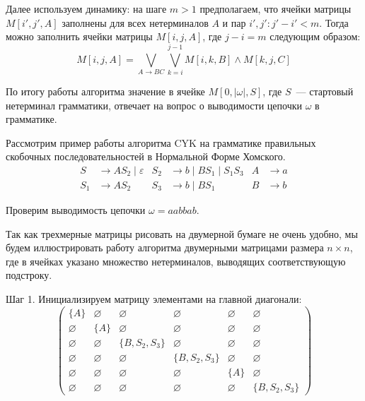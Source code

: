 Далее используем динамику: на шаге $m > 1$ предполагаем, что ячейки матрицы $M[i', j', A]$ заполнены для всех нетерминалов $A$ и пар $i', j': j' - i' < m$.
Тогда можно заполнить ячейки матрицы $M[i, j, A]$, где $j - i = m$ следующим образом:
\[ M[i, j, A] = \bigvee_{A \to B C} \bigvee_{k = i}^{j-1} M[i, k, B] \wedge M[k, j, C] \]

По итогу работы алгоритма значение в ячейке $M[0, |\omega|, S]$, где $S$~--- стартовый нетерминал грамматики, отвечает на вопрос о выводимости цепочки $\omega$ в грамматике.

\begin{example}\label{exmpl:CYK}
    Рассмотрим пример работы алгоритма CYK на грамматике правильных скобочных последовательностей в Нормальной Форме Хомского.
    \begin{align*}
        S   & \to A S_2 \mid \varepsilon & S_2 & \to b \mid B S_1 \mid S_1 S_3 & A & \to a \\
        S_1 & \to A S_2                  & S_3 & \to b \mid B S_1              & B & \to b
    \end{align*}

    Проверим выводимость цепочки $\omega = a a b b a b$.

    Так как трехмерные матрицы рисовать на двумерной бумаге не очень удобно, мы будем иллюстрировать работу алгоритма двумерными матрицами размера $n \times n$, где в ячейках указано множество нетерминалов, выводящих соответствующую подстроку.

    Шаг 1.
    Инициализируем матрицу элементами на главной диагонали:
    \[
        \begin{pmatrix}
            \{A\}       & \varnothing & \varnothing     & \varnothing     & \varnothing & \varnothing     \\
            \varnothing & \{A\}       & \varnothing     & \varnothing     & \varnothing & \varnothing     \\
            \varnothing & \varnothing & \{B, S_2, S_3\} & \varnothing     & \varnothing & \varnothing     \\
            \varnothing & \varnothing & \varnothing     & \{B, S_2, S_3\} & \varnothing & \varnothing     \\
            \varnothing & \varnothing & \varnothing     & \varnothing     & \{A\}       & \varnothing     \\
            \varnothing & \varnothing & \varnothing     & \varnothing     & \varnothing & \{B, S_2, S_3\}
        \end{pmatrix}
    \]


\end{example}
